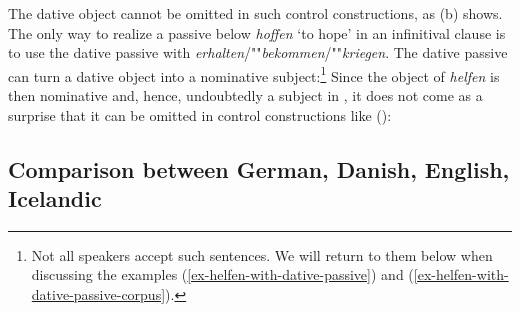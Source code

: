 \eal
{}
\zl
The dative object cannot be omitted in such control constructions, as (b) shows. The only way
to realize a passive below \emph{hoffen} `to hope' in an infinitival clause is to use the dative passive with
\emph{erhalten}/""\emph{bekommen}/""\emph{kriegen}. The dative passive can turn a dative object into a
nominative subject:\footnote{
  Not all speakers accept such sentences. We will return to them below when discussing the examples
  (\ref{ex-helfen-with-dative-passive}) and (\ref{ex-helfen-with-dative-passive-corpus}).
}
\z
\largerpage[-1]
Since the object of \emph{helfen} is then nominative and, hence, undoubtedly a subject in , it
does not come as a surprise that it can be omitted in control constructions like ():
\z
{}


\subsection{Comparison between German, Danish, English, Icelandic}

